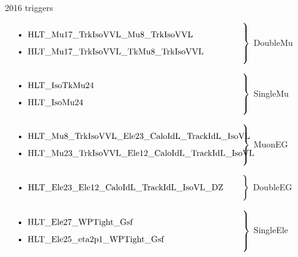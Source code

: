 \documentclass[9pt]{beamer}
\begin{document}
\begin{frame}{2016 triggers}
\justifying

$\left. \text{\parbox{0.8\linewidth}{
\begin{itemize}
\item HLT\_Mu17\_TrkIsoVVL\_Mu8\_TrkIsoVVL
\item HLT\_Mu17\_TrkIsoVVL\_TkMu8\_TrkIsoVVL
\end{itemize}
}} \right \}$ \alert{DoubleMu} \vfill

$\left. \text{\parbox{0.8\linewidth}{
\begin{itemize}
\item HLT\_IsoTkMu24
\item HLT\_IsoMu24
\end{itemize}
}} \right \}$ \alert{SingleMu} \vfill

$\left. \text{\parbox{0.8\linewidth}{
\begin{itemize}
\item HLT\_Mu8\_TrkIsoVVL\_Ele23\_CaloIdL\_TrackIdL\_IsoVL
\item HLT\_Mu23\_TrkIsoVVL\_Ele12\_CaloIdL\_TrackIdL\_IsoVL
\end{itemize}
}} \right \}$ \alert{MuonEG} \vfill

$\left. \text{\parbox{0.8\linewidth}{
\begin{itemize}
\item HLT\_Ele23\_Ele12\_CaloIdL\_TrackIdL\_IsoVL\_DZ
\end{itemize}
}} \right \}$ \alert{DoubleEG} \vfill

$\left. \text{\parbox{0.8\linewidth}{
\begin{itemize}
\item HLT\_Ele27\_WPTight\_Gsf
\item HLT\_Ele25\_eta2p1\_WPTight\_Gsf
\end{itemize}
}} \right \}$ \alert{SingleEle} \vfill
\end{frame}
\end{document}
